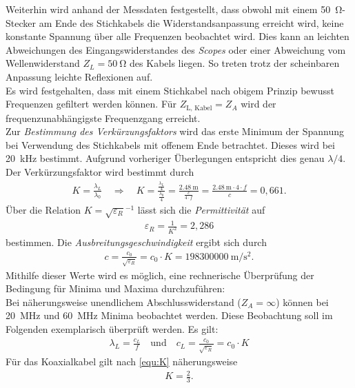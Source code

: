 \documentclass[a4paper,twoside,final]{article}
\begin{document}
Weiterhin wird anhand der Messdaten festgestellt, dass obwohl mit einem \SI{50}{\ohm}-Stecker am Ende des Stichkabels die Widerstandsanpassung erreicht wird, keine konstante Spannung über alle Frequenzen beobachtet wird. Dies kann an leichten Abweichungen des Eingangswiderstandes des \textit{Scopes} oder einer Abweichung vom Wellenwiderstand $Z_L = \SI{50}{\ohm}$ des Kabels liegen. So treten trotz der scheinbaren Anpassung leichte Reflexionen auf. \\
Es wird festgehalten, dass mit einem Stichkabel nach obigem Prinzip bewusst Frequenzen gefiltert werden können. Für $Z_\text{L, Kabel} = Z_A$ wird der frequenzunabhängigste Frequenzgang erreicht.\\

Zur \textit{Bestimmung des Verkürzungsfaktors} wird das erste Minimum der Spannung bei Verwendung des Stichkabels mit offenem Ende betrachtet. Dieses wird bei \SI{20}{\kilo\hertz} bestimmt. Aufgrund vorheriger Überlegungen entspricht dies genau $\lambda/4$. Der Verkürzungsfaktor wird bestimmt durch
\begin{align}\label{equ:K}
K = \frac{\lambda_{L}}{\lambda_0} \quad\Rightarrow\quad K = \frac{\frac{\lambda_L}{4}}{\frac{\lambda_0}{4}} = \frac{\SI{2,48}{\metre}}{\frac{c}{4\cdot f}} = \frac{\SI{2,48}{\metre}\cdot 4 \cdot f}{c} = 0,661.
\end{align}
Über die Relation $K = \sqrt{\varepsilon_R}^{-1}$ lässt sich die \textit{Permittivität} auf
\begin{align}
\varepsilon_R = \frac{1}{K^2} = 2,286
\end{align}
bestimmen. Die \textit{Ausbreitungsgeschwindigkeit} ergibt sich durch
\begin{align}
c = \frac{c_0}{\sqrt{\varepsilon_R}} = c_0 \cdot K = \SI{198300000}{\metre\per\second\squared}.
\end{align}
 Mithilfe dieser Werte wird es möglich, eine rechnerische Überprüfung der Bedingung für Minima und Maxima durchzuführen:\\
 Bei näherungsweise unendlichem Abschlusswiderstand ($Z_A = \infty$) können bei
 \SI{20}{\mega\hertz} und \SI{60}{\mega\hertz} Minima beobachtet werden. Diese Beobachtung soll im Folgenden exemplarisch überprüft werden. Es gilt:
 \begin{align}
   \lambda_{L}  = \frac{c_{L}}{f} \quad \text{und} \quad c_{L} = \frac{c_0}{\sqrt{\varepsilon_R}} = c_0 \cdot K
 \end{align}
 Für das Koaxialkabel gilt nach \ref{equ:K} näherungsweise
 \begin{align}
   K = \frac{2}{3}.
 \end{align}
\end{document}
